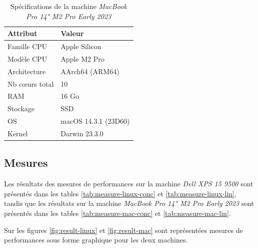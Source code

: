\documentclass[
  french,
  a4paper,
]{scrartcl}
\begin{document}
\begin{table}[h]
  \centering
\begin{tabular}[pos]{|l|l|}
  \hline
  \textbf{Attribut} & \textbf{Valeur} \\
  \hline\hline
  Famille CPU & Apple Silicon\\
  \hline
  Modèle CPU &  Apple M2 Pro \\
  \hline
  Architecture & AArch64 (ARM64)\\
  \hline
  Nb cœurs total & 10\\
  \hline
  RAM & 16 Go \\
  \hline
  Stockage & SSD \\
  \hline
  OS & macOS 14.3.1 (23D60)\\
  \hline
  Kernel & Darwin 23.3.0\\
  \hline
\end{tabular}
\caption{Spécifications de la machine \textit{MacBook Pro 14" M2 Pro Early 2023}}
\label{tab:spec-mac}
\end{table}

\subsection{Mesures}

Les résultats des mesures de performances sur la machine \textit{Dell XPS 15 9500} 
sont présentés dans les tables \ref{tab:measure-linux-conc} et \ref{tab:measure-linux-lin}, 
tandis que les résultats sur la machine \textit{MacBook Pro 14" M2 Pro Early 2023}
sont présentés dans les tables \ref{tab:measure-mac-conc} et \ref{tab:measure-mac-lin}.

Sur les figures \ref{fig:result-linux} et \ref{fig:result-mac} sont représentées
mesures de performances sous forme graphique pour les deux machines. 
\end{document}
